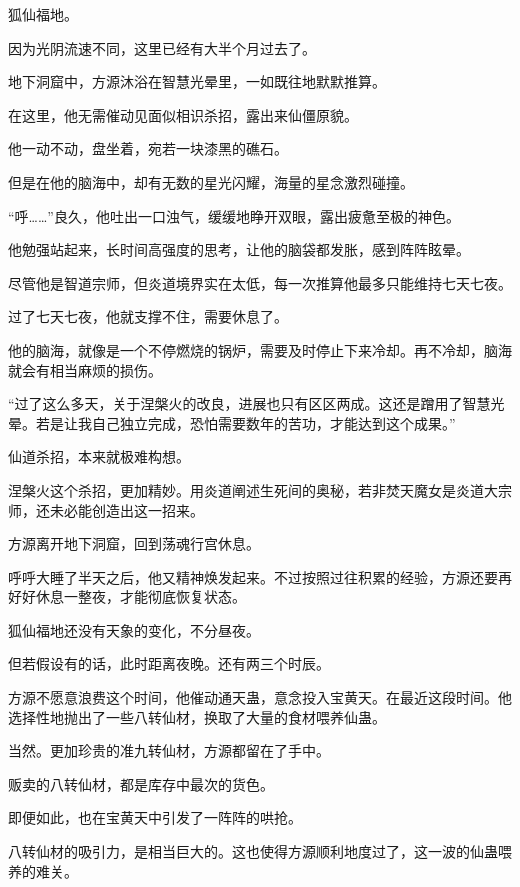 
\begin{this_body}



狐仙福地。

因为光阴流速不同，这里已经有大半个月过去了。

地下洞窟中，方源沐浴在智慧光晕里，一如既往地默默推算。

在这里，他无需催动见面似相识杀招，露出来仙僵原貌。

他一动不动，盘坐着，宛若一块漆黑的礁石。

但是在他的脑海中，却有无数的星光闪耀，海量的星念激烈碰撞。

“呼……”良久，他吐出一口浊气，缓缓地睁开双眼，露出疲惫至极的神色。

他勉强站起来，长时间高强度的思考，让他的脑袋都发胀，感到阵阵眩晕。

尽管他是智道宗师，但炎道境界实在太低，每一次推算他最多只能维持七天七夜。

过了七天七夜，他就支撑不住，需要休息了。

他的脑海，就像是一个不停燃烧的锅炉，需要及时停止下来冷却。再不冷却，脑海就会有相当麻烦的损伤。

“过了这么多天，关于涅槃火的改良，进展也只有区区两成。这还是蹭用了智慧光晕。若是让我自己独立完成，恐怕需要数年的苦功，才能达到这个成果。”

仙道杀招，本来就极难构想。

涅槃火这个杀招，更加精妙。用炎道阐述生死间的奥秘，若非焚天魔女是炎道大宗师，还未必能创造出这一招来。

方源离开地下洞窟，回到荡魂行宫休息。

呼呼大睡了半天之后，他又精神焕发起来。不过按照过往积累的经验，方源还要再好好休息一整夜，才能彻底恢复状态。

狐仙福地还没有天象的变化，不分昼夜。

但若假设有的话，此时距离夜晚。还有两三个时辰。

方源不愿意浪费这个时间，他催动通天蛊，意念投入宝黄天。在最近这段时间。他选择性地抛出了一些八转仙材，换取了大量的食材喂养仙蛊。

当然。更加珍贵的准九转仙材，方源都留在了手中。

贩卖的八转仙材，都是库存中最次的货色。

即便如此，也在宝黄天中引发了一阵阵的哄抢。

八转仙材的吸引力，是相当巨大的。这也使得方源顺利地度过了，这一波的仙蛊喂养的难关。


\end{this_body}
